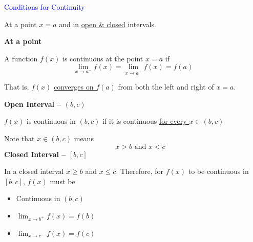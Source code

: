\documentclass[14pt,fleqn]{extarticle}
\begin{document}
\begin{skill}
\begin{narrow}
\textcolor{blue}{Conditions for Continuity}

At a point $x=a$ and in \underline{open \& closed} intervals. 

\end{narrow}
\reason 

\textbf{At a point} 

A function $f(x)$ is continuous at the point $x=a$ if 
\[ \lim_{x\to a^-} f(x) = \lim_{x\to a^+}f(x) = f(a) \]

That is, $f(x)$ \underline{converges on $f(a)$} from both the left and right of $x=a$. 
\newline

\textbf{Open Interval -- $(b,c)$}

$f(x)$ is continuous in $ \left(b,c \right)$ if it is continuous \underline{for every $x\in \left(b,c \right)$}
\newline 

Note that $x\in \left(b,c \right)$ means
\[ \qquad x > b\text{ and } x < c\] 
\textbf{Closed Interval -- $\left[b,c \right]$}

In a closed interval $x\geq b$ and $x\leq c$. Therefore, for $f(x)$ to be continuous in $\left[b,c \right]$, $f(x)$ must be 

\begin{itemize}
\item{Continuous in $\left(b,c \right)$}
\item{$\lim_{x\to b^+}f(x) = f(b)$}
\item{$\lim_{x\to c^-} f(x) = f(c)$} 
\end{itemize} 

\end{skill}
\end{document}
